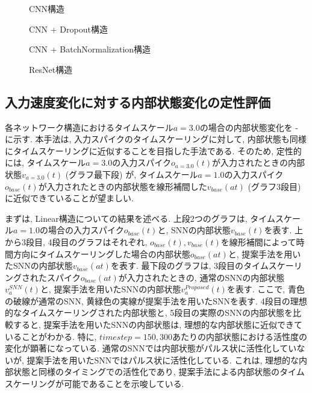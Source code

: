 \begin{figure}[htb]
    \centering
    
    \caption{CNN構造}
    \label{fig:result1:1:cnn}
\end{figure}

\begin{figure}[htb]
    \centering
    
    \caption{CNN + Dropout構造}
    \label{fig:result1:1:cnn:dropout}
\end{figure}

\begin{figure}[htb]
    \centering
    
    \caption{CNN + BatchNormalization構造}
    \label{fig:result1:1:cnn:batchnormalization}
\end{figure}

\begin{figure}[htb]
    \centering
    
    \caption{ResNet構造}
    \label{fig:result1:1:resnet}
\end{figure}


\clearpage
\subsection{入力速度変化に対する内部状態変化の定性評価}
各ネットワーク構造におけるタイムスケール$a=3.0$の場合の内部状態変化を - に示す.
本手法は, 入力スパイクのタイムスケーリングに対して, 内部状態も同様にタイムスケーリングに近似することを目指した手法である.
そのため, 定性的には, タイムスケール$a=3.0$の入力スパイク$o_{a=3.0}(t)$が入力されたときの内部状態$v_{a=3.0}(t)$ (グラフ最下段) が, タイムスケール$a=1.0$の入力スパイク$o_{base}(t)$が入力されたときの内部状態を線形補間した$v_{base}(at)$ (グラフ3段目) に近似できていることが望ましい.

まずは, Linear構造についての結果を述べる.
上段2つのグラフは, タイムスケール$a=1.0$の場合の入力スパイク$o_{base}(t)$と, SNNの内部状態$v_{base}(t)$を表す.
上から3段目, 4段目のグラフはそれぞれ, $o_{base}(t), v_{base}(t)$を線形補間によって時間方向にタイムスケーリングした場合の内部状態$o_{base}(at)$と, 提案手法を用いたSNNの内部状態$v_{base}(at)$を表す.
最下段のグラフは, 3段目のタイムスケーリングされたスパイク$o_{base}(at)$が入力されたときの, 通常のSNNの内部状態$v_a^{SNN}(t)$と, 提案手法を用いたSNNの内部状態$v_a^{Proposed}(t)$を表す.
ここで, 青色の破線が通常のSNN, 黄緑色の実線が提案手法を用いたSNNを表す.
4段目の理想的なタイムスケーリングされた内部状態と, 5段目の実際のSNNの内部状態を比較すると, 提案手法を用いたSNNの内部状態は, 理想的な内部状態に近似できていることがわかる.
特に, $timestep=150, 300$あたりの内部状態における活性度の変化が顕著になっている.
通常のSNNでは内部状態がパルス状に活性化していないが, 提案手法を用いたSNNではパルス状に活性化している.
これは, 理想的な内部状態と同様のタイミングでの活性化であり, 提案手法による内部状態のタイムスケーリングが可能であることを示唆している.

